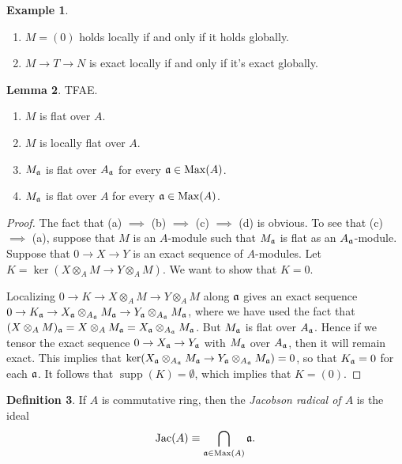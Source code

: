 \documentclass[10pt,letterpaper,cm]{nupset}
\theoremstyle{definition}
\newtheorem{definition}{Definition}[subsection]
\newtheorem{exmp}[definition]{Example}
\theoremstyle{theorem}
\newtheorem{lemma}[definition]{Lemma}
\theoremstyle{remark}
\newcommand{\1}{\mathbf{1}}
\newcommand{\0}{\vec 0}
\DeclareMathOperator{\Jac}{Jac}
\DeclareMathOperator{\Max}{Max}
\DeclareMathOperator{\supp}{supp}
\begin{document}
\begin{exmp} $ $
\begin{enumerate}
\item $M = (0)$ holds locally if and only if it holds globally. 
\item $M \to T \to N$ is exact locally if and only if it's exact globally. 
\end{enumerate}
\end{exmp}

\begin{lemma}  TFAE.
\begin{enumerate}[label=(\alph*)]
\item $M$ is flat over $A$.  
\item $M$ is locally flat over $A$. 
\item $M_{\frak{a}}$ is flat over $A_{\frak{a}}$ for every $\frak{a} \in \Max(A)$. 
\item $M_{\frak{a}}$ is flat over $A$ for every $\frak{a} \in \Max(A)$. 
\end{enumerate}
\end{lemma}
\begin{proof}
The fact that (a) $\implies$ (b) $\implies$ (c) $\implies$ (d) is obvious. To see that (c) $\implies$ (a), suppose that $M$ is an $A$-module such that $M_{\frak{a}}$ is flat  as an $A_{\frak{a}}$-module. 
Suppose that $0 \to X \to Y$ is an exact sequence of $A$-modules. Let $K = \ker( X \otimes_A M \to Y \otimes_A M)$. We want to show that $K=0$.   

Localizing $0 \to K \to X \otimes_A M \to Y \otimes_A M$ along $\frak{a}$ gives an exact sequence $0 \to K_{\frak{a}} \to X_{\frak{a}} \otimes_{A_{\frak{a}}} M_{\frak{a}} \to Y_{\frak{a}} \otimes_{A_{\frak{a}}} M_{\frak{a}}$, where we have used the fact that $(X \otimes_A M)_{\frak{a}} = X \otimes_A M_{\frak{a}} = X_{\frak{a}} \otimes_{A_{\frak{a}}} M_{\frak{a}}$. But $M_{\frak{a}}$ is flat over $A_{\frak{a}}$. Hence if we tensor the exact sequence $0 \to X_{\frak{a}} \to Y_{\frak{a}}$ with $M_{\frak{a}}$ over $A_{\frak{a}}$, then it will remain exact. This implies that $\ker(X_{\frak{a}} \otimes_{A_{\frak{a}}} M_{\frak{a}} \to Y_{\frak{a}} \otimes_{A_{\frak{a}}} M_{\frak{a}}) =0$, so that $K_{\frak{a}} = 0$ for each $\frak{a}$. It follows that $\supp(K) = \emptyset$, which implies that $K= (0)$. 
\end{proof}

\begin{definition}
If $A$ is commutative ring, then the \textit{Jacobson radical of $A$} is the ideal $$\Jac(A) \equiv \bigcap_{\frak{a} \in \Max(A)} \frak{a} .$$
\end{definition}
\end{document}
